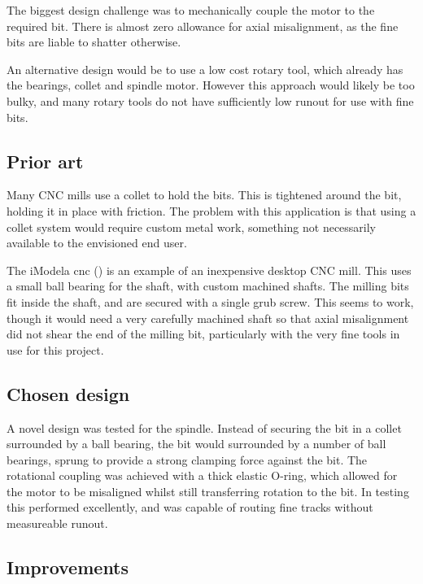 The biggest design challenge was to mechanically couple the motor to the
required bit. There is almost zero allowance for axial misalignment, as 
the fine bits are liable to shatter otherwise.

An alternative design would be to use a low cost rotary tool, which already has the bearings, collet and spindle motor. 
However this approach would likely be too bulky, and many rotary tools
do not have sufficiently low runout for use with fine bits.

\subsection{Prior art}
Many CNC mills use a collet to hold the bits. This is tightened
around the bit, holding it in place with friction. The problem with this
application is that using a collet system would require custom metal work,
something not necessarily available to the envisioned end user.

The iModela cnc (\cite{imodela}) is an example of an inexpensive desktop
CNC mill. This uses a small ball bearing for the shaft, with custom machined shafts. The milling bits fit inside the shaft, and
are secured with a single grub screw. This seems to work, though it would need a very carefully machined shaft so that axial misalignment
did not shear the end of the milling bit, particularly with the very
fine tools in use for this project.

\subsection{Chosen design}
A novel design was tested for the spindle. Instead of securing
the bit in a collet surrounded by a ball bearing, the bit would 
surrounded by a number of ball bearings, sprung to provide a strong clamping
force against the bit. The rotational coupling was achieved with
a thick elastic O-ring, which allowed for the motor to be misaligned
whilst still transferring rotation to the bit. In testing this performed
excellently, and was capable of routing fine tracks without measureable runout.

\subsection{Improvements}

